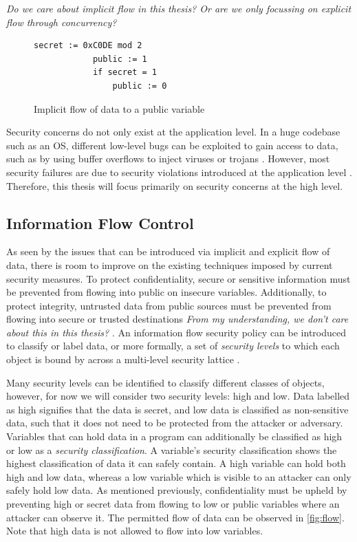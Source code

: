 \documentclass[twocolumn]{article}
\begin{document}
    \textit{Do we care about implicit flow in this thesis? Or are we only focussing on explicit flow through concurrency?}


    \begin{figure}
        \label{fig:implicit}
        \begin{lstlisting}[gobble=2]
            secret := 0xC0DE mod 2
            public := 1
            if secret = 1
                public := 0
        \end{lstlisting}
        \caption{Implicit flow of data to a public variable}
    \end{figure}

    Security concerns do not only exist at the application level. In a huge codebase such as an OS, different low-level bugs can be exploited to gain access to data, such as by using buffer overflows to inject viruses or trojans \cite{agten2012recent}. However, most security failures are due to security violations introduced at the application level \cite{jang2010empirical}. Therefore, this thesis will focus primarily on security concerns at the high level.

    \subsection{Information Flow Control}
    As seen by the issues that can be introduced via implicit and explicit flow of data, there is room to improve on the existing techniques imposed by current security measures. To protect confidentiality, secure or sensitive information must be prevented from flowing into public on insecure variables. Additionally, to protect integrity, untrusted data from public sources must be prevented from flowing into secure or trusted destinations \textit{From my understanding, we don't care about this in this thesis?} \cite{balliu2014logics}. An information flow security policy can be introduced to classify or label data, or more formally, a set of \textit{security levels} to which each object is bound by across a multi-level security lattice \cite{denning1976lattice}. 
    
    Many security levels can be identified to classify different classes of objects, however, for now we will consider two security levels: high and low. Data labelled as high signifies that the data is secret, and low data is classified as non-sensitive data, such that it does not need to be protected from the attacker or adversary. Variables that can hold data in a program can additionally be classified as high or low as a \textit{security classification}. A variable's security classification shows the highest classification of data it can safely contain. A high variable can hold both high and low data, whereas a low variable which is visible to an attacker can only safely hold low data. As mentioned previously, confidentiality must be upheld by preventing high or secret data from flowing to low or public variables where an attacker can observe it. The permitted flow of data can be observed in \ref{fig:flow}. Note that high data is not allowed to flow into low variables. 
    
\end{document}
